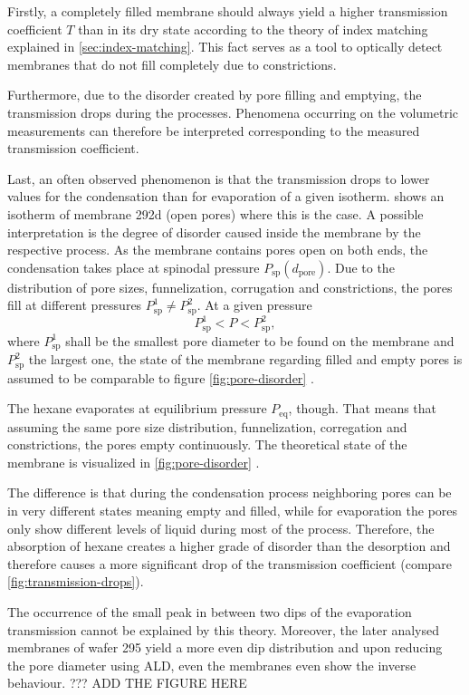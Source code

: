 \documentclass[../thesis.tex]{subfiles}
\begin{document}
                Firstly, a completely filled membrane should always yield a higher transmission coefficient $T$ than in its dry state according to the theory of index matching explained in \cref{sec:index-matching}. This fact serves as a tool to optically detect membranes that do not fill completely due to constrictions.

                Furthermore, due to the disorder created by pore filling and emptying, the transmission drops during the processes. Phenomena occurring on the volumetric measurements can therefore be interpreted corresponding to the measured transmission coefficient.

                Last, an often observed phenomenon is that the transmission drops to lower values for the condensation than for evaporation of a given isotherm.  shows an isotherm of membrane 292d (open pores) where this is the case. A possible interpretation is the degree of disorder caused inside the membrane by the respective process. As the membrane contains pores open on both ends, the condensation takes place at spinodal pressure $P_\mathrm{sp}(d_\mathrm{pore})$. Due to the distribution of pore sizes, funnelization, corrugation and constrictions, the pores fill at different pressures $P_\mathrm{sp}^1 \neq P_\mathrm{sp}^2$. At a given pressure
                \begin{equation*}
                    P_\mathrm{sp}^1 < P < P_\mathrm{sp}^2,
                \end{equation*}
                where $P_\mathrm{sp}^1$ shall be the smallest pore diameter to be found on the membrane and $P_\mathrm{sp}^2$ the largest one, the state of the me{}mbrane regarding filled and empty pores is assumed to be comparable to figure \cref{fig:pore-disorder} \protect{}.

                The hexane evaporates at equilibrium pressure $P_\mathrm{eq}$, though. That means that assuming the same pore size distribution, funnelization, corregation and constrictions, the pores empty continuously. The theoretical state of the membrane is visualized in \cref{fig:pore-disorder} \protect{}.
                \medskip

                

                The difference is that during the condensation process neighboring pores can be in very different states meaning empty and filled, while for evaporation the pores only show different levels of liquid during most of the process. Therefore, the absorption of hexane creates a higher grade of disorder than the desorption and therefore causes a more significant drop of the transmission coefficient (compare \cref{fig:transmission-drops}).
                \medskip

                The occurrence of the small peak in between two dips of the evaporation transmission cannot be explained by this theory. Moreover, the later analysed membranes of wafer 295 yield a more even dip distribution and upon reducing the pore diameter using ALD, even the membranes even show the inverse behaviour. ??? ADD THE FIGURE HERE
\end{document}
